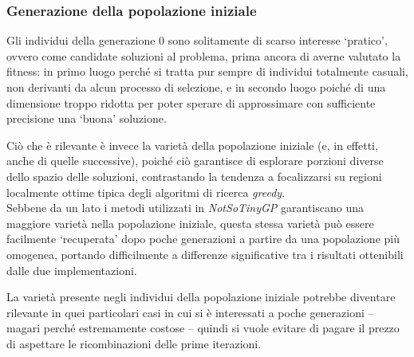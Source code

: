 \documentclass{../llncs}
\begin{document}

\subsubsection{Generazione della popolazione iniziale}
Gli individui della generazione 0 sono solitamente di scarso interesse `pratico', ovvero come candidate soluzioni al problema, prima ancora di averne valutato la fitness: in primo luogo perché si tratta pur sempre di individui totalmente casuali, non derivanti da alcun processo di selezione, e in secondo luogo poiché di una dimensione troppo ridotta per poter sperare di approssimare con sufficiente precisione una `buona' soluzione.

Ciò che è rilevante è invece la varietà della popolazione iniziale (e, in effetti, anche di quelle successive), poiché ciò garantisce di esplorare porzioni diverse dello spazio delle soluzioni, contrastando la tendenza a focalizzarsi su regioni localmente ottime tipica degli algoritmi di ricerca \emph{greedy}.\\

Sebbene da un lato i metodi utilizzati in \emph{NotSoTinyGP} garantiscano una maggiore varietà nella popolazione iniziale, questa stessa varietà può essere facilmente `recuperata' dopo poche generazioni a partire da una popolazione più omogenea, portando difficilmente a differenze significative tra i risultati ottenibili dalle due implementazioni.

La varietà presente negli individui della popolazione iniziale potrebbe diventare rilevante in quei particolari casi in cui si è interessati a poche generazioni -- magari perché estremamente costose -- quindi si vuole evitare di pagare il prezzo di aspettare le ricombinazioni delle prime iterazioni.
\end{document}
